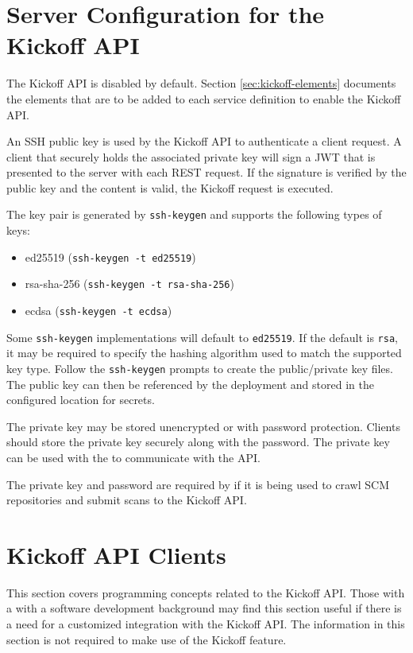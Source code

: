 \section{Server Configuration for the Kickoff API}\label{sec:kickoff-server-config}

The Kickoff API is disabled by default.  Section \ref{sec:kickoff-elements} documents the elements that
are to be added to each service definition to enable the Kickoff API.

An SSH public key is used by the Kickoff API to authenticate a client request.  A client that
securely holds the associated private key will sign a JWT that is presented to the server with each REST
request.  If the signature is verified by the public key and the content is valid, the Kickoff request is executed.

The key pair is generated by \texttt{ssh-keygen} and supports the following types of keys:

\begin{itemize}
  \item ed25519 (\texttt{ssh-keygen -t ed25519})
  \item rsa-sha-256 (\texttt{ssh-keygen -t rsa-sha-256})
  \item ecdsa (\texttt{ssh-keygen -t ecdsa})
\end{itemize}

Some \texttt{ssh-keygen} implementations will default to \texttt{ed25519}.  If the default is \texttt{rsa},
it may be required to specify the hashing algorithm used to match the supported key type.  Follow the
\texttt{ssh-keygen} prompts to create the public/private key files.  The public key can then be referenced
by the \cxoneflow deployment and stored in the configured location for secrets.

The private key may be stored unencrypted or with password protection.  Clients should store the private key
securely along with the password.  The private key can be used with the 
to communicate with the API.

The private key and password are required by \cxoneflowaudit if it is being used to crawl SCM
repositories and submit scans to the Kickoff API.


\section{Kickoff API Clients}

This section covers programming concepts related to the \cxoneflow Kickoff API.  
Those with a with a software development background may find this section useful
if there is a need for a customized integration with the Kickoff API. The information
in this section is not required to make use of the \cxoneflow Kickoff feature.

